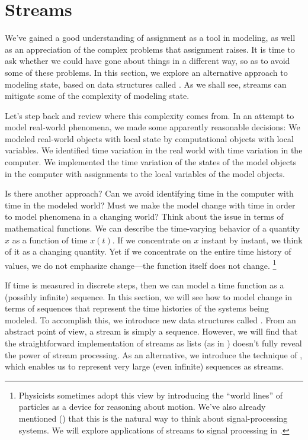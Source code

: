 \section{Streams}
\label{Section 3.5}

We’ve gained a good understanding of assignment as a tool in modeling, as well as an appreciation of the complex problems that assignment raises.
It is time to ask whether we could have gone about things in a different way, so as to avoid some of these problems.
In this section, we explore an alternative approach to modeling state, based on data structures called .
As we shall see, streams can mitigate some of the complexity of modeling state.

Let’s step back and review where this complexity comes from.
In an attempt to model real-world phenomena, we made some apparently reasonable decisions:
We modeled real-world objects with local state by computational objects with local variables.
We identified time variation in the real world with time variation in the computer.
We implemented the time variation of the states of the model objects in the computer with assignments to the local variables of the model objects.

Is there another approach?
Can we avoid identifying time in the computer with time in the modeled world?
Must we make the model change with time in order to model phenomena in a changing world?
Think about the issue in terms of mathematical functions.
We can describe the time-varying behavior of a quantity \( x \) as a function of time \( x(t) \).
If we concentrate on \( x \) instant by instant, we think of it as a changing quantity.
Yet if we concentrate on the entire time history of values, we do not emphasize change---the function itself does not change.%
\footnote{
	Physicists sometimes adopt this view by introducing the “world lines” of particles as a device for reasoning about motion.
	We’ve also already mentioned () that this is the natural way to think about signal-processing systems.
	We will explore applications of streams to signal processing in .
}

If time is measured in discrete steps, then we can model a time function as a (possibly infinite) sequence.
In this section, we will see how to model change in terms of sequences that represent the time histories of the systems being modeled.
To accomplish this, we introduce new data structures called .
From an abstract point of view, a stream is simply a sequence.
However, we will find that the straightforward implementation of streams as lists (as in ) doesn’t fully reveal the power of stream processing.
As an alternative, we introduce the technique of , which enables us to represent very large (even infinite) sequences as streams.

